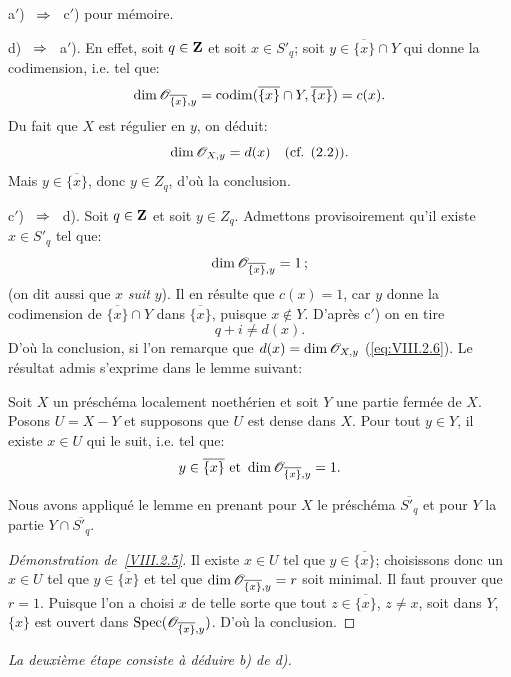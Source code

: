 a$'$) ~$\To$~ c$'$) pour m\'emoire.

d) ~$\To$~ a$'$). En effet, soit $q\in \mathbf{Z}$ et soit $x\in S'_q$; soit $y\in\overline{\{x\}}\cap Y$ qui \og donne la codimension\fg, i.e. tel que:
\begin{equation} \label{eq:VIII.2.5} \dim {\mathscr O}_{\overline{\{x\}}, y}=\operatorname{codim}(\overline{\{x\}}\cap Y, \overline{\{x\}})=c(x).
\end{equation}
Du fait que $X$ est r\'egulier en $y$, on d\'eduit:
\begin{equation} \label{eq:VIII.2.6} \dim {\mathscr O}_{X, y}=d(x)\quad \text{(cf. (2.2)).}
\end{equation}
Mais $y\in\overline{\{x\}}$, donc $y\in Z_q$, d'o\`u la conclusion.

c$'$) ~$\To$~ d). Soit $q\in\mathbf{Z}$ et soit $y\in Z_q$. Admettons provisoirement qu'il existe $x\in S'_q$ tel que:
\[
\dim {\mathscr O}_{\overline{\{x\}}, y}=1\, \text{;}\]
(on dit aussi que $x$ \emph{suit} $y$). Il en r\'esulte que $c(x)=1$, car $y$ \og donne la codimension de $\overline{\{x\}}\cap Y$ dans $\overline{\{x\}}$\fg, puisque $x\not\in Y$. D'apr\`es c$'$) on en tire
\[q+i\neq d(x).
\]
D'o\`u la conclusion, si l'on remarque que $d(x)=\dim {\mathscr O}_{X, y}$ (\ref{eq:VIII.2.6}). Le r\'esultat admis s'exprime dans le lemme suivant:

\begin{lemme} \label{VIII.2.5} Soit $X$ un pr\'esch\'ema localement noeth\'erien et soit $Y$ une partie ferm\'ee de $X$. Posons $U=X-Y$ et supposons que $U$ est dense dans $X$. Pour tout $y\in Y$, il existe $x\in U$ \og qui le suit\fg, i.e. tel que:
\[y\in\overline{\{x\}}\text{ et } \dim{\mathscr O}_{\overline{\{x\}}, y}=1.
\]
\end{lemme}

Nous avons appliqu\'e le lemme en prenant pour $X$ le pr\'esch\'ema $\overline{S'_q}$ et pour $Y$ la partie $Y\cap \overline{S'_q}$.

\begin{proof}[D\'emonstration de~\ref{VIII.2.5}]
Il existe $x\in U$ tel que $y\in\overline{\{x\}}$; choisissons donc un $x\in U$ tel que $y\in\overline{\{x\}}$ et tel que $\dim {\mathscr O}_{\overline{\{x\}}, y}=r$ soit minimal. Il faut prouver que $r=1$. Puisque l'on a choisi $x$ de telle sorte que tout $z\in\overline{\{x\}}$, $z\neq x$, soit dans $Y$, $\{x\}$ est ouvert dans $\operatorname{Spec}({\mathscr O}_{\overline{\{x\}}, y})$. D'o\`u la conclusion.
\skipqed
\end{proof}

\emph{La deuxième étape consiste à déduire \textup{b)} de \textup{d)}.}

